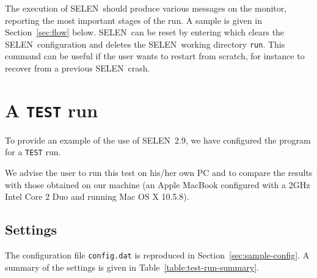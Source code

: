 \documentclass[11pt,fleqn,a4paper,titlepage]{article}
\newcommand\selen{\textsf{SELEN~}}
\begin{document}
The execution of \selen should produce various messages on the monitor, reporting
the most important stages of the run. A sample is given in Section~\ref{sec:flow} below. 
\selen can be reset by entering
{\color{red}{\normalsize\begin{verbatim} 
$ make clean
\end{verbatim} }}
\vspace{0.1cm}
\noindent which clears the \selen configuration and deletes the \selen working directory \texttt{run}.  This command can be useful if the user wants to restart from scratch, for instance to recover from a previous \selen crash.  
\clearpage 

\section{A \texttt{TEST} run}\label{section:test-run}

To provide an example of the use of \selen 2.9, we have configured the program for a \texttt{TEST} run.

We advise the user to run this test on his/her own PC and to compare the results 
with those obtained on our machine (an Apple MacBook configured with a 2GHz Intel Core 2 Duo and running Mac OS X 10.5.8). 

\subsection{Settings}\label{sec:test-run-settings}

The configuration file \texttt{config.dat} is reproduced in Section~\ref{sec:sample-config}. 
A summary of the settings is given in 
Table~\ref{table:test-run-summary}. 
\end{document}
